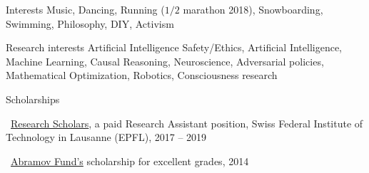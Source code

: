 \documentclass{resume} %
\newcommand*{\mybold}[1]{{\color{pinkunderline} #1}}
\newcommand{\mylink}{{\color{gray}\faExternalLink}}
\begin{document}
\begin{rSection}{Interests}
	Music, Dancing, Running ($1/2$ marathon 2018), Snowboarding, Swimming, Philosophy, DIY, Activism
\end{rSection}

\begin{rSection}{Research interests}
	Artificial Intelligence Safety/Ethics, Artificial Intelligence, Machine Learning, Causal Reasoning, Neuroscience, Adversarial policies, Mathematical Optimization, Robotics, Consciousness research %
\end{rSection}

\begin{rSection}{Scholarships}
	\vspace{-1em}
	\item \mylink~\href{https://www.epfl.ch/schools/ic/education/master/research-scholars/}{Research Scholars}, a paid \mybold{Research Assistant} position, Swiss Federal Institute of Technology in Lausanne (EPFL), 2017 -- 2019
	\item \mylink~\href{https://web.archive.org/web/20190730104204/http://phystech-foundation.org/}{Abramov Fund's} scholarship for excellent \mybold{grades,} 2014
\end{rSection}

\end{document}

